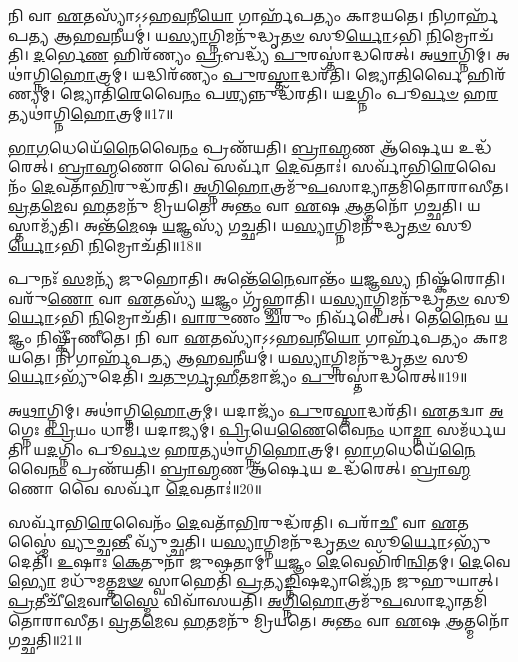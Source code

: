 𑌨𑌿 𑌵𑌾 \ul{𑌏}\-𑌤𑌸𑍍𑌯𑌾᳴\-𑌽𑌽𑌹\-\ul{𑌵}\-𑌨𑍀\-\ul{𑌯𑍋} 𑌗𑌾𑌰𑍍\mbox{}𑌹᳴𑌪𑌤𑍍𑌯𑌂 𑌕𑌾𑌮𑌯𑌤𑍇।
𑌨𑌿𑌗𑌾𑌰𑍍\mbox{}𑌹᳴𑌪𑌤𑍍𑌯 𑌆𑌹\-\ul{𑌵}\-𑌨𑍀𑌯𑌮𑍍॑।
𑌯\-\ul{𑌸𑍍𑌯𑌾}\-𑌗𑍍𑌨𑌿𑌮𑌨𑍁᳴𑌦𑍍𑌧𑍃\-\ul{𑌤}\-\-\ul{𑍞} 𑌸𑍂\-\ul{𑌰𑍍𑌯𑍋}\-𑌽𑌭𑌿 \ul{𑌨𑌿}\-𑌮𑍍𑌰𑍋𑌚᳴𑌤𑌿।
\-\ul{𑌦}\-𑌰𑍍𑌭𑍇\-\ul{𑌣} 𑌹𑌿𑌰᳴𑌣𑍍𑌯𑌂 \ul{𑌪𑍍𑌰}\-𑌬𑌦𑍍𑌧𑍍𑌯᳴ \ul{𑌪𑍁}\-𑌰𑌸𑍍𑌤𑌾॑𑌦𑍍𑌧𑌰𑍇𑌤𑍍।
𑌅\-\ul{𑌥𑌾}\-𑌗𑍍𑌨𑌿𑌮𑍍।
𑌅𑌥𑌾॑𑌗𑍍𑌨𑌿\-\ul{𑌹𑍋}\-𑌤𑍍𑌰𑌮𑍍।
𑌯𑌦𑍍𑌧𑌿𑌰᳴𑌣𑍍𑌯𑌂 \ul{𑌪𑍁}\-𑌰\-\ul{𑌸𑍍𑌤𑌾}\-𑌦𑍍𑌧𑌰᳴𑌤𑌿।
𑌜𑍍𑌯𑍋\-\ul{𑌤𑌿}\-𑌰𑍍𑌵𑍈 𑌹𑌿𑌰᳴𑌣𑍍𑌯𑌮𑍍।
𑌜𑍍𑌯𑍋𑌤𑌿᳴\-\ul{𑌰𑍇}\-𑌵𑍈\-\ul{𑌨𑌂} 𑌪\-\ul{𑌶𑍍𑌯}\-𑌨𑍍𑌨𑍁𑌦𑍍𑌧᳴𑌰𑌤𑌿।
𑌯\-\ul{𑌦}\-𑌗𑍍𑌨𑌿𑌂 𑌪𑍂\-\ul{𑌰𑍍𑌵}\-\-\ul{𑍞} 𑌹\-\ul{𑌰}\-𑌤𑍍𑌯𑌥𑌾॑𑌗𑍍𑌨𑌿\-\ul{𑌹𑍋}\-𑌤𑍍𑌰𑌮𑍍॥17॥

\-\ul{𑌭𑌾}\-\-\ul{𑌗}\-𑌧𑍇𑌯𑍇᳴\-\ul{𑌨𑍈}\-𑌵𑍈\-\ul{𑌨𑌂} 𑌪𑍍𑌰𑌣᳴𑌯𑌤𑌿।
\-\ul{𑌬𑍍𑌰𑌾}\-\-\ul{𑌹𑍍𑌮}\-𑌣 𑌆᳴𑌰𑍍\mbox{}\-\ul{𑌷𑍇}\-𑌯 𑌉𑌦𑍍𑌧᳴𑌰𑍇𑌤𑍍।
\-\ul{𑌬𑍍𑌰𑌾}\-\-\ul{𑌹𑍍𑌮}\-𑌣𑍋 𑌵𑍈 𑌸𑌰𑍍𑌵𑌾᳴ \ul{𑌦𑍇}\-𑌵𑌤𑌾𑌃॑।
𑌸𑌰𑍍𑌵𑌾᳴𑌭𑌿\-\ul{𑌰𑍇}\-𑌵𑍈𑌨𑌂᳴ \ul{𑌦𑍇}\-𑌵𑌤𑌾᳴\-\ul{𑌭𑌿}\-𑌰𑍁𑌦𑍍𑌧᳴𑌰𑌤𑌿।
\-\ul{𑌅}\-\-\ul{𑌗𑍍𑌨𑌿}\-\-\ul{𑌹𑍋}\-𑌤𑍍𑌰𑌮𑍁᳴\-\ul{𑌪}\-𑌸𑌾𑌦𑍍𑌯𑌾𑌤𑌮𑌿᳴𑌤𑍋𑌰𑌾𑌸𑍀𑌤।
\-\ul{𑌵𑍍𑌰}\-𑌤\-\ul{𑌮𑍇}\-𑌵 \ul{𑌹}\-𑌤𑌮𑌨𑍁᳴ 𑌮𑍍𑌰𑌿𑌯𑌤𑍇।
𑌅\-\ul{𑌨𑍍𑌤𑌂} 𑌵𑌾 \ul{𑌏}\-𑌷 \ul{𑌆}\-𑌤𑍍𑌮𑌨𑍋᳴ 𑌗𑌚𑍍𑌛𑌤𑌿।
𑌯𑌸𑍍𑌤𑌾𑌮𑍍𑌯᳴𑌤𑌿।
𑌅𑌨𑍍𑌤᳴\-\ul{𑌮𑍇}\-𑌷 \ul{𑌯}\-𑌜𑍍𑌞𑌸𑍍𑌯᳴ 𑌗𑌚𑍍𑌛𑌤𑌿।
𑌯\-\ul{𑌸𑍍𑌯𑌾}\-𑌗𑍍𑌨𑌿𑌮𑌨𑍁᳴𑌦𑍍𑌧𑍃\-\ul{𑌤}\-\-\ul{𑍞} 𑌸𑍂\-\ul{𑌰𑍍𑌯𑍋}\-𑌽𑌭𑌿 \ul{𑌨𑌿}\-𑌮𑍍𑌰𑍋𑌚᳴𑌤𑌿॥18॥

𑌪𑍁𑌨𑌃᳴ \ul{𑌸}\-𑌮𑌨𑍍𑌯᳴ 𑌜𑍁𑌹𑍋𑌤𑌿।
𑌅𑌨𑍍𑌤𑍇᳴\-\ul{𑌨𑍈}\-𑌵𑌾𑌨𑍍𑌤𑌂᳴ \ul{𑌯}\-𑌜𑍍𑌞\-\ul{𑌸𑍍𑌯} 𑌨𑌿𑌷𑍍𑌕᳴𑌰𑍋𑌤𑌿।
𑌵𑌰𑍁᳴\-\ul{𑌣𑍋} 𑌵𑌾 \ul{𑌏}\-𑌤𑌸𑍍𑌯᳴ \ul{𑌯}\-𑌜𑍍𑌞𑌂 𑌗𑍃᳴𑌹𑍍𑌣𑌾𑌤𑌿।
𑌯\-\ul{𑌸𑍍𑌯𑌾}\-𑌗𑍍𑌨𑌿𑌮𑌨𑍁᳴𑌦𑍍𑌧𑍃\-\ul{𑌤}\-\-\ul{𑍞} 𑌸𑍂\-\ul{𑌰𑍍𑌯𑍋}\-𑌽𑌭𑌿 \ul{𑌨𑌿}\-𑌮𑍍𑌰𑍋𑌚᳴𑌤𑌿।
\-\ul{𑌵𑌾}\-\-\ul{𑌰𑍁}\-𑌣𑌂 \ul{𑌚}\-𑌰𑍁𑌂 𑌨𑌿𑌰𑍍𑌵᳴𑌪𑍇𑌤𑍍।
𑌤𑍇\-\ul{𑌨𑍈}\-𑌵 \ul{𑌯}\-𑌜𑍍𑌞𑌂 𑌨𑌿𑌷𑍍𑌕𑍍𑌰𑍀᳴𑌣𑍀𑌤𑍇।
𑌨𑌿 𑌵𑌾 \ul{𑌏}\-𑌤𑌸𑍍𑌯𑌾᳴\-𑌽𑌽𑌹\-\ul{𑌵}\-𑌨𑍀\-\ul{𑌯𑍋} 𑌗𑌾𑌰𑍍\mbox{}𑌹᳴𑌪𑌤𑍍𑌯𑌂 𑌕𑌾𑌮𑌯𑌤𑍇।
𑌨𑌿 𑌗𑌾𑌰𑍍\mbox{}𑌹᳴𑌪𑌤𑍍𑌯 𑌆𑌹\-\ul{𑌵}\-𑌨𑍀𑌯𑌮𑍍॑।
𑌯\-\ul{𑌸𑍍𑌯𑌾}\-𑌗𑍍𑌨𑌿𑌮𑌨𑍁᳴𑌦𑍍𑌧𑍃\-\ul{𑌤}\-\-\ul{𑍞} 𑌸𑍂\-\ul{𑌰𑍍𑌯𑍋}\-\-𑌽𑌭𑍍𑌯𑍁᳴𑌦𑍇𑌤𑌿᳴।
\-\ul{𑌚}\-\-\ul{𑌤𑍁}\-\-\ul{𑌰𑍍𑌗𑍃}\-\-\ul{𑌹𑍀}\-𑌤𑌮𑌾𑌜𑍍𑌯𑌂᳴ \ul{𑌪𑍁}\-𑌰𑌸𑍍𑌤𑌾॑𑌦𑍍𑌧𑌰𑍇𑌤𑍍॥19॥

𑌅\-\ul{𑌥𑌾}\-𑌗𑍍𑌨𑌿𑌮𑍍।
𑌅𑌥𑌾॑𑌗𑍍𑌨𑌿\-\ul{𑌹𑍋}\-𑌤𑍍𑌰𑌮𑍍।
𑌯𑌦𑌾𑌜𑍍𑌯𑌂᳴ \ul{𑌪𑍁}\-𑌰\-\ul{𑌸𑍍𑌤𑌾}\-𑌦𑍍𑌧𑌰᳴𑌤𑌿।
\-\ul{𑌏}\-𑌤𑌦𑍍𑌵𑌾 \ul{𑌅}\-𑌗𑍍𑌨𑍇𑌃 \ul{𑌪𑍍𑌰𑌿}\-𑌯𑌂 𑌧𑌾𑌮᳴।
𑌯𑌦𑌾𑌜𑍍𑌯𑌮𑍍॑।
\-\ul{𑌪𑍍𑌰𑌿}\-𑌯𑍇\-\ul{𑌣𑍈}\-𑌵𑍈\-\ul{𑌨𑌂} 𑌧𑌾\-\ul{𑌮𑍍𑌨𑌾} 𑌸𑌮᳴𑌰𑍍𑌧𑌯𑌤𑌿।
𑌯\-\ul{𑌦}\-𑌗𑍍𑌨𑌿𑌂 𑌪𑍂\-\ul{𑌰𑍍𑌵}\-\-\ul{𑍞} 𑌹\-\ul{𑌰}\-𑌤𑍍𑌯𑌥𑌾॑𑌗𑍍𑌨𑌿\-\ul{𑌹𑍋}\-𑌤𑍍𑌰𑌮𑍍।
\-\ul{𑌭𑌾}\-\-\ul{𑌗}\-𑌧𑍇𑌯𑍇᳴\-\ul{𑌨𑍈}\-𑌵𑍈\-\ul{𑌨𑌂} 𑌪𑍍𑌰𑌣᳴𑌯𑌤𑌿।
\-\ul{𑌬𑍍𑌰𑌾}\-\-\ul{𑌹𑍍𑌮}\-𑌣 𑌆᳴𑌰𑍍\mbox{}\-\ul{𑌷𑍇}\-𑌯 𑌉𑌦𑍍𑌧᳴𑌰𑍇𑌤𑍍।
\-\ul{𑌬𑍍𑌰𑌾}\-\-\ul{𑌹𑍍𑌮}\-𑌣𑍋 𑌵𑍈 𑌸𑌰𑍍𑌵𑌾᳴ \ul{𑌦𑍇}\-𑌵𑌤𑌾𑌃॑॥20॥

𑌸𑌰𑍍𑌵𑌾᳴𑌭𑌿\-\ul{𑌰𑍇}\-𑌵𑍈𑌨𑌂᳴ \ul{𑌦𑍇}\-𑌵𑌤𑌾᳴\-\ul{𑌭𑌿}\-𑌰𑍁𑌦𑍍𑌧᳴𑌰𑌤𑌿।
𑌪𑌰𑌾᳴\-\ul{𑌚𑍀} 𑌵𑌾 \ul{𑌏}\-𑌤𑌸𑍍𑌮𑍈॑ \ul{𑌵𑍍𑌯𑍁}\-𑌚𑍍𑌛\-\ul{𑌨𑍍𑌤𑍀} 𑌵𑍍𑌯𑍁᳴𑌚𑍍𑌛𑌤𑌿।
𑌯\-\ul{𑌸𑍍𑌯𑌾}\-𑌗𑍍𑌨𑌿𑌮𑌨𑍁᳴𑌦𑍍𑌧𑍃\-\ul{𑌤}\-\-\ul{𑍞} 𑌸𑍂\-\ul{𑌰𑍍𑌯𑍋}\-\-𑌽𑌭𑍍𑌯𑍁᳴𑌦𑍇𑌤𑌿᳴।
\-\ul{𑌉}\-𑌷𑌾𑌃 \ul{𑌕𑍇}\-𑌤𑍁𑌨𑌾᳴ 𑌜𑍁𑌷𑌤𑌾𑌮𑍍।
\-\ul{𑌯}\-𑌜𑍍𑌞𑌂 \ul{𑌦𑍇}\-𑌵𑍇𑌭𑌿᳴𑌰𑌿\-\ul{𑌨𑍍𑌵𑌿}\-𑌤𑌮𑍍।
\-\ul{𑌦𑍇}\-𑌵𑍇\-\ul{𑌭𑍍𑌯𑍋} 𑌮𑌧𑍁᳴𑌮𑌤𑍍𑌤\-\ul{𑌮}\-\-\ul{𑍟} 𑌸𑍍𑌵𑌾𑌹𑍇𑌤𑌿᳴ \ul{𑌪𑍍𑌰}\-𑌤𑍍𑌯\-\ul{𑌙𑍍𑌨𑌿}\-𑌷𑌦𑍍𑌯𑌾𑌜𑍍𑌯𑍇᳴𑌨 𑌜𑍁𑌹𑍁𑌯𑌾𑌤𑍍।
\-\ul{𑌪𑍍𑌰}\-𑌤𑍀𑌚𑍀᳴\-\ul{𑌮𑍇}\-𑌵𑌾\-\ul{𑌸𑍍𑌮𑍈} 𑌵𑌿𑌵𑌾᳴𑌸𑌯𑌤𑌿।
\-\ul{𑌅}\-\-\ul{𑌗𑍍𑌨𑌿}\-\-\ul{𑌹𑍋}\-𑌤𑍍𑌰𑌮𑍁᳴\-\ul{𑌪}\-𑌸𑌾𑌦𑍍𑌯𑌾𑌤𑌮𑌿᳴𑌤𑍋𑌰𑌾𑌸𑍀𑌤।
\-\ul{𑌵𑍍𑌰}\-𑌤\-\ul{𑌮𑍇}\-𑌵 \ul{𑌹}\-𑌤𑌮𑌨𑍁᳴ 𑌮𑍍𑌰𑌿𑌯𑌤𑍇।
𑌅\-\ul{𑌨𑍍𑌤𑌂} 𑌵𑌾 \ul{𑌏}\-𑌷 \ul{𑌆}\-𑌤𑍍𑌮𑌨𑍋᳴ 𑌗𑌚𑍍𑌛𑌤𑌿॥21॥

